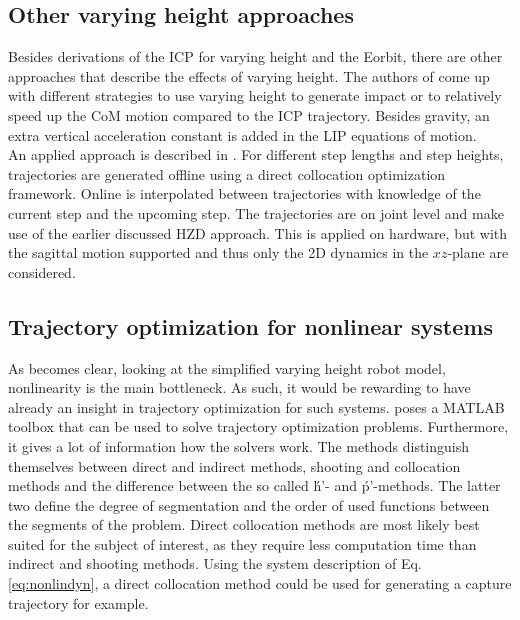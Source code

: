 \subsection{Other varying height approaches}
Besides derivations of the \ac{ICP} for varying height and the \ac{Eorbit}, there are other approaches that describe the effects of varying height. The authors of \cite{gao2017increase} come up with different strategies to use varying height to generate impact or to relatively speed up the \ac{CoM} motion compared to the \ac{ICP} trajectory. Besides gravity, an extra vertical acceleration constant is added in the \ac{LIP} equations of motion. \\
An applied approach is described in \cite{nguyen2017dynamic}. For different step lengths and step heights, trajectories are generated offline using a direct collocation optimization framework. Online is interpolated between trajectories with knowledge of the current step and the upcoming step. The trajectories are on joint level and make use of the earlier discussed \ac{HZD} approach. This is applied on hardware, but with the sagittal motion supported and thus only the \ac{2D} dynamics in the $xz$-plane are considered.

\subsection{Trajectory optimization for nonlinear systems}
As becomes clear, looking at the simplified varying height robot model, nonlinearity is the main bottleneck. As such, it would be rewarding to have already an insight in trajectory optimization for such systems. \cite{kelly2017introduction} poses a MATLAB  toolbox that can be used to solve trajectory optimization problems. Furthermore, it gives a lot of information how the solvers work. The methods distinguish themselves between direct and indirect methods, shooting and collocation methods and the difference between the so called \'h'- and \'p'-methods. The latter two define the degree of segmentation and the order of used functions between the segments of the problem. Direct collocation methods are most likely best suited for the subject of interest, as they require less computation time than indirect and shooting methods. Using the system description of Eq. \eqref{eq:nonlindyn}, a direct collocation method could be used for generating a capture trajectory for example. 
